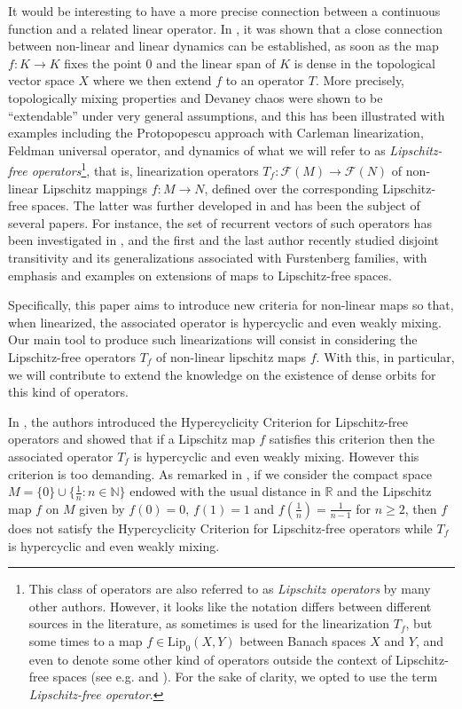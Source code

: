 \documentclass[12pt,english]{amsart}
\numberwithin{equation}{section}
\theoremstyle{plain}
\theoremstyle{definition}
\newcommand{\free}[1]{\mathcal{F}(#1)}
\def\lip{ \text{Lip}}
\begin{document}
It would be interesting to have a more precise connection between a continuous function and a related linear operator. In \cite{MP15}, it was shown that a close connection between non-linear and linear dynamics can be established, as soon as the map $f\colon K\to K$ fixes the point $0$ and the linear span of $K$ is dense in the topological vector space $X$ where we then extend $f$ to an operator $T$. More precisely, topologically mixing properties and Devaney chaos were shown to be ``extendable'' under very general assumptions, and this has been illustrated with examples including the Protopopescu approach with Carleman linearization, Feldman universal operator, and dynamics of what we will refer to as \textit{Lipschitz-free operators}\footnote{This class of operators are also referred to as \textit{Lipschitz operators} by many other authors. However, it looks like the notation differs between different sources in the literature, as sometimes is used for the linearization $T_f$, but some times to a map $f\in \lip_0(X,Y)$ between Banach spaces $X$ and $Y$, 
 and even to denote some other kind of operators outside the context of Lipschitz-free spaces (see e.g. \cite{Rob89} and \cite{wang12}). For the sake of clarity, we opted to use the term \textit{Lipschitz-free operator}.}, that is, linearization operators $T_f\colon \free{M}\to \free{N}$ of non-linear Lipschitz mappings $f\colon M\to N$, defined over the corresponding Lipschitz-free spaces. The latter was further developed in \cite{ACP21} and has been the subject of several papers. For instance, the set of recurrent vectors of such operators has been investigated in \cite{Tap24}, and the first and the last author \cite{CP25} recently studied disjoint transitivity and its generalizations associated with Furstenberg families, with emphasis and examples on extensions of maps to Lipschitz-free spaces. 

Specifically, this paper aims to introduce new criteria for non-linear maps so that, when linearized, the associated operator is hypercyclic and even weakly mixing. Our main tool to produce such linearizations will consist in considering the Lipschitz-free operators $T_f$ of non-linear lipschitz maps $f$. With this, in particular, we will contribute to extend the knowledge on the existence of dense orbits for this kind of operators. 

In \cite{ACP21}, the authors introduced the Hypercyclicity Criterion for Lipschitz-free operators and showed that if a Lipschitz map $f$ satisfies this criterion then the associated operator $T_f$ is hypercyclic and even weakly mixing. However this criterion is too demanding. As remarked in \cite{ACP21}, if we consider the compact space $M=\{0\}\cup\{\frac{1}{n}:n\in \mathbb{N}\}$ endowed with the usual distance in $\mathbb{R}$ and the Lipschitz map $f$ on $M$ given by $f(0)=0$, $f(1)=1$ and $f(\frac{1}{n})=\frac{1}{n-1}$ for $n\ge 2$, then $f$ does not satisfy the Hypercyclicity Criterion for Lipschitz-free operators while $T_f$ is hypercyclic and even weakly mixing. 
\end{document}
